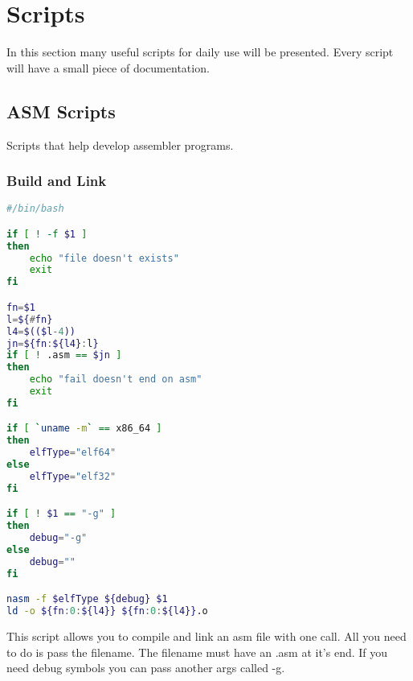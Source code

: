 \section{Scripts}
In this section many useful scripts for daily use will be presented. Every
script will have a small piece of documentation.

\subsection{ASM Scripts}
Scripts that help develop assembler programs.

\subsubsection{Build and Link}
\lstset{basicstyle=\scriptsize, numbers=left, captionpos=b, tabsize=4}
\begin{lstlisting}[caption=Build and Link,language={Bash},
xleftmargin=20pt, label=lst:firstNamsProgram]
#/bin/bash

if [ ! -f $1 ]
then
	echo "file doesn't exists"
	exit
fi

fn=$1
l=${#fn}
l4=$(($l-4))
jn=${fn:${l4}:l}
if [ ! .asm == $jn ] 
then
	echo "fail doesn't end on asm"
	exit
fi

if [ `uname -m` == x86_64 ] 
then
	elfType="elf64"
else
	elfType="elf32"
fi

if [ ! $1 == "-g" ]
then
	debug="-g"
else
	debug=""
fi

nasm -f $elfType ${debug} $1
ld -o ${fn:0:${l4}} ${fn:0:${l4}}.o 
\end{lstlisting}
This script allows you to compile and link an asm file with one call. All you
need to do is pass the filename. The filename must have an .asm at it's end.
If you need debug symbols you can pass another args called -g.
